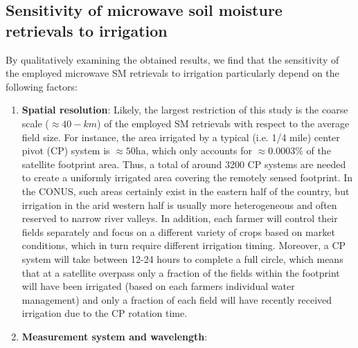 \documentclass[hess, manuscript]{copernicus}
\begin{document}
\subsection{Sensitivity of microwave soil moisture retrievals to irrigation}
\label{ssec:irrigation-sensitivity}
By qualitatively examining the obtained results, we find that the sensitivity of the employed microwave SM retrievals to irrigation particularly depend on the following factors:

\begin{enumerate}
\item \textbf{Spatial resolution}: 
Likely, the largest restriction of this study is the coarse scale ($\approx 40-km$) of the employed SM retrievals with respect to the average field size. For instance, the area irrigated by a typical (i.e. 1/4 mile) center pivot (CP) system is $\approx 50 \si{\hectare}$, which only accounts for $ \approx 0.0003 \%$ of the satellite footprint area. Thus, a total of around 3200 CP systems are needed to create a uniformly irrigated area covering the remotely sensed footprint. In the CONUS, such areas certainly exist in the eastern half of the country, but irrigation in the arid western half is usually more heterogeneous and often reserved to narrow river valleys. In addition, each farmer will control their fields separately and focus on a different variety of crops based on market conditions, which in turn require different irrigation timing. Moreover, a CP system will take between 12-24 hours to complete a full circle, which means that at a satellite overpass only a fraction of the fields within the footprint will have been irrigated (based on each farmers individual water management) and only a fraction of each field will have recently received irrigation due to the CP rotation time. 
%
\item \textbf{Measurement system and wavelength}: 

\end{enumerate}
\end{document}

